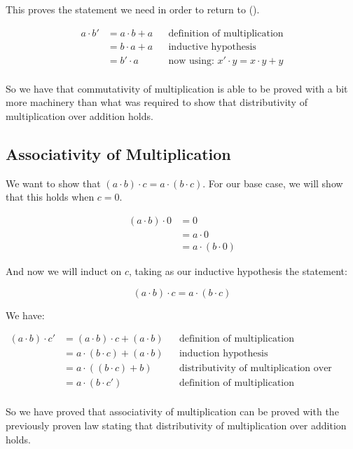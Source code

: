 \documentclass{article}
\begin{document}
This proves the statement we need in order to return to (\Frowny{}).

\begin{align*}
a \cdot b' &= a \cdot b + a && \text{definition of multiplication} \\
&= b \cdot a + a && \text{inductive hypothesis} \\
&= b' \cdot a && \text{now using: } x' \cdot y = x \cdot y + y \\
\end{align*}

So we have that commutativity of multiplication is able to be proved with a bit more machinery than what was required to show that distributivity of multiplication over addition holds.

\subsection*{Associativity of Multiplication}

We want to show that $(a \cdot b) \cdot c = a \cdot (b \cdot c)$. For our base case, we will show that this holds when $c = 0$.

\begin{align*}
(a \cdot b) \cdot 0 &= 0 \\
&= a \cdot 0 \\
&= a \cdot( b \cdot 0)
\end{align*}

And now we will induct on $c$, taking as our inductive hypothesis the statement:

$$(a \cdot b) \cdot c = a \cdot (b \cdot c)$$

We have:

\begin{align*}
(a \cdot b) \cdot c' &= (a \cdot b) \cdot c + (a \cdot b) && \text{definition of multiplication} \\
&= a \cdot (b \cdot c) + (a \cdot b) && \text{induction hypothesis} \\
&= a \cdot ((b \cdot c) + b) && \text{distributivity of multiplication over addition} \\
&= a \cdot (b \cdot c') && \text{definition of multiplication} \\
\end{align*}

So we have proved that associativity of multiplication can be proved with the previously proven law stating that distributivity of multiplication over addition holds.
\end{document}
